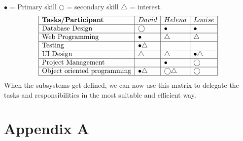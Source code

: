 \documentclass[12pt]{article}
\begin{document}
$\bullet$ = Primary skill \quad $\bigcirc$ = secondary skill \quad $\bigtriangleup$ = interest.
\[
\begin{array}{|l|l|l|l|}
\hline
\textbf{Tasks/Participant} & David & Helena & Louise\\
\hline
\text{Database Design} & \bigcirc & \bullet & \bullet\\
\hline
\text{Web Programming} & \bullet & \bigtriangleup & \bigtriangleup\\
\hline
\text{Testing} & \bullet \bigtriangleup & & \\
\hline
\text{UI Design} & \bigtriangleup & \bigtriangleup & \bullet \bigtriangleup\\
\hline
\text{Project Management} & & \bullet & \bigcirc\\
\hline
\text{Object oriented programming} & \bullet \bigtriangleup& \bigcirc \bigtriangleup & \bigcirc \\
\hline
\end{array}
\]
When the subsystems get defined, we can now use this matrix to delegate the tasks and responsibilities in the most suitable and efficient way.
\section{Appendix A}
\end{document}
